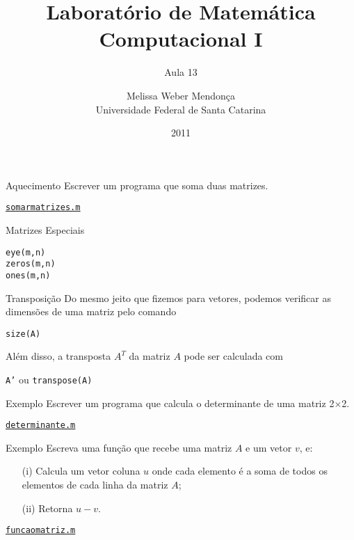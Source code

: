 \documentclass[hyperref={pdfpagelabels=false}]{beamer}
\title{Laboratório de Matemática Computacional I}
\subtitle{Aula 13}
\author[M. Weber Mendonça]{Melissa Weber Mendonça\\
Universidade Federal de Santa Catarina}
\date{2011}
\begin{document}
\setmonofont{Inconsolata}

\begin{frame}
  \titlepage
\end{frame}

\begin{frame}{Aquecimento}
  Escrever um programa que soma duas matrizes.
  \vfill
  \begin{center} \href{listings/somarmatrizes.m}{\underline{\texttt{somarmatrizes.m}}} \end{center}
\end{frame}

\begin{frame}{Matrizes Especiais}
  \begin{center}
    {\texttt{eye(m,n)}}\\
    {\texttt{zeros(m,n)}}\\
    {\texttt{ones(m,n)}}
  \end{center}
\end{frame}

\begin{frame}{Transposição}
  Do mesmo jeito que fizemos para vetores, podemos verificar as dimensões de uma matriz pelo comando\\
	\begin{center} {\texttt{size(A)}} \end{center}
	Além disso, a transposta $A^T$ da matriz $A$ pode ser calculada com
	\begin{center} {\texttt{A'}} ou {\texttt{transpose(A)}}\end{center}
\end{frame}

\begin{frame}{Exemplo}
  Escrever um programa que calcula o determinante de uma matriz 2$\times $2.
  \vfill
  \begin{center} \href{listings/determinante.m}{\underline{\texttt{determinante.m}}} \end{center}
\end{frame}

\begin{frame}{Exemplo}
  Escreva uma função que recebe uma matriz $A$ e um vetor $v$, e:
  \begin{itemize}
  \item[(i)] Calcula um vetor coluna $u$ onde cada elemento é a soma de todos os elementos de cada linha da matriz $A$;
  \item[(ii)] Retorna $u-v$.
  \end{itemize}
  \vfill
  \begin{center} \href{listings/funcaomatriz.m}{\underline{\texttt{funcaomatriz.m}}} \end{center}
\end{frame}
\end{document}

